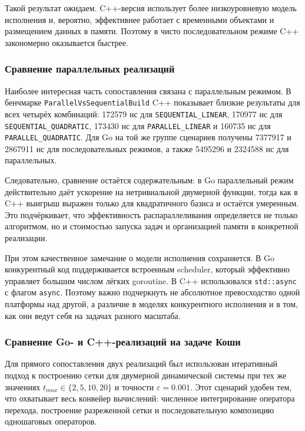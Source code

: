 Такой результат ожидаем. C++-версия использует более низкоуровневую модель исполнения и, вероятно, эффективнее работает с временными объектами и размещением данных в памяти. Поэтому в чисто последовательном режиме C++ закономерно оказывается быстрее.

\subsubsection{Сравнение параллельных реализаций}

Наиболее интересная часть сопоставления связана с параллельным режимом. В бенчмарке \texttt{ParallelVsSequentialBuild} C++ показывает близкие результаты для всех четырёх комбинаций: 172579 нс для \texttt{SEQUENTIAL\_LINEAR}, 170977 нс для \texttt{SEQUENTIAL\_QUADRATIC}, 173430 нс для \texttt{PARALLEL\_LINEAR} и 160735 нс для \texttt{PARALLEL\_QUADRATIC}. Для Go на той же группе сценариев получены 7377917 и 2867911 нс для последовательных режимов, а также 5495296 и 2324588 нс для параллельных.

Следовательно, сравнение остаётся содержательным: в Go параллельный режим действительно даёт ускорение на нетривиальной двумерной функции, тогда как в C++ выигрыш выражен только для квадратичного базиса и остаётся умеренным. Это подчёркивает, что эффективность распараллеливания определяется не только алгоритмом, но и стоимостью запуска задач и организацией памяти в конкретной реализации.

При этом качественное замечание о модели исполнения сохраняется. В Go конкурентный код поддерживается встроенным scheduler, который эффективно управляет большим числом лёгких goroutine. В C++ использовался \texttt{std::async} с флагом \texttt{async}. Поэтому важно подчеркнуть не абсолютное превосходство одной платформы над другой, а различие в моделях конкурентного исполнения и в том, как они ведут себя на задачах разного масштаба.

\subsubsection{Сравнение Go- и C++-реализаций на задаче Коши}

Для прямого сопоставления двух реализаций был использован итеративный подход к построению сетки для двумерной динамической системы при тех же значениях $t_{max} \in \{2, 5, 10, 20\}$ и точности $\varepsilon = 0.001$. Этот сценарий удобен тем, что охватывает весь конвейер вычислений: численное интегрирование оператора перехода, построение разреженной сетки и последовательную композицию одношаговых операторов.

